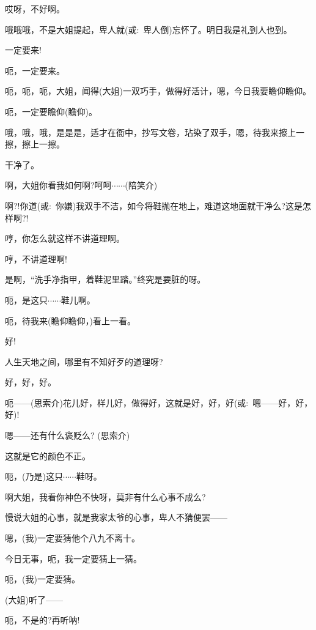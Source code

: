 {{哎呀，不好啊。}

{哦哦哦，不是大姐提起，卑人就(或:~卑人倒)忘怀了。明日我是礼到人也到。}

{一定要来!}

{呃，一定要来。}

{呃，呃，呃，大姐，闻得(大姐)一双巧手，做得好活计，嗯，今日我要瞻仰瞻仰。}

{呃，一定要瞻仰(瞻仰)。}

{哦，哦，哦，是是是，适才在衙中，抄写文卷，玷染了双手，嗯，待我来擦上一擦，擦上一擦。}

{干净了。}\hspace{10pt}~

{啊，大姐你看我如何啊?呵呵$\cdots{}\cdots{}$(陪笑{\hwfs 介})}

{啊?!你道(或:~你嫌)我双手不洁，如今将鞋抛在地上，难道这地面就干净么?这是怎样啊?!}

{哼，你怎么就这样不讲道理啊。}

{哼，不讲道理啊!}

{是啊，``洗手净指甲，着鞋泥里踏。''终究是要脏的呀。}

{呃，是这只$\cdots{}\cdots{}$鞋儿啊。}

{呃，待我来(瞻仰瞻仰，)看上一看。}

{好!}\hspace{30pt}~

{人生天地之间，哪里有不知好歹的道理呀?}

{好，好，好。}

{呃------(思索{\hwfs 介})花儿好，样儿好，做得好，这就是好，好，好(或:~嗯------好，好，好)!}

{嗯------还有什么褒贬么? (思索{\hwfs 介})}

{这就是它的颜色不正。}

{呃，(乃是)这只$\cdots{}\cdots{}$鞋呀。}

{啊大姐，我看你神色不快呀，莫非有什么心事不成么?}

{慢说大姐的心事，就是我家太爷的心事，卑人不猜便罢------}

{嗯，(我)一定要猜他个八九不离十。}

{今日无事，呃，我一定要猜上一猜。}

{呃，(我)一定要猜。}

{(大姐)听了------}


{呃，不是的?再听呐!}


}
